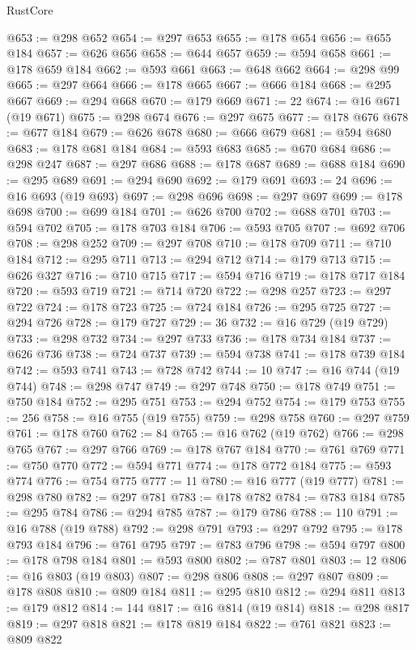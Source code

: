 \begin{lexlean}{RustCore}
\begin{coremodule}
@653 := @298 @652
@654 := @297 @653
@655 := @178 @654
@656 := @655 @184
@657 := @626 @656
@658 := @644 @657
@659 := @594 @658
@661 := @178 @659 @184
@662 := @593 @661
@663 := @648 @662
@664 := @298 @99
@665 := @297 @664
@666 := @178 @665
@667 := @666 @184
@668 := @295 @667
@669 := @294 @668
@670 := @179 @669
@671 := 22
@674 := @16 @671 (@19 @671)
@675 := @298 @674
@676 := @297 @675
@677 := @178 @676
@678 := @677 @184
@679 := @626 @678
@680 := @666 @679
@681 := @594 @680
@683 := @178 @681 @184
@684 := @593 @683
@685 := @670 @684
@686 := @298 @247
@687 := @297 @686
@688 := @178 @687
@689 := @688 @184
@690 := @295 @689
@691 := @294 @690
@692 := @179 @691
@693 := 24
@696 := @16 @693 (@19 @693)
@697 := @298 @696
@698 := @297 @697
@699 := @178 @698
@700 := @699 @184
@701 := @626 @700
@702 := @688 @701
@703 := @594 @702
@705 := @178 @703 @184
@706 := @593 @705
@707 := @692 @706
@708 := @298 @252
@709 := @297 @708
@710 := @178 @709
@711 := @710 @184
@712 := @295 @711
@713 := @294 @712
@714 := @179 @713
@715 := @626 @327
@716 := @710 @715
@717 := @594 @716
@719 := @178 @717 @184
@720 := @593 @719
@721 := @714 @720
@722 := @298 @257
@723 := @297 @722
@724 := @178 @723
@725 := @724 @184
@726 := @295 @725
@727 := @294 @726
@728 := @179 @727
@729 := 36
@732 := @16 @729 (@19 @729)
@733 := @298 @732
@734 := @297 @733
@736 := @178 @734 @184
@737 := @626 @736
@738 := @724 @737
@739 := @594 @738
@741 := @178 @739 @184
@742 := @593 @741
@743 := @728 @742
@744 := 10
@747 := @16 @744 (@19 @744)
@748 := @298 @747
@749 := @297 @748
@750 := @178 @749
@751 := @750 @184
@752 := @295 @751
@753 := @294 @752
@754 := @179 @753
@755 := 256
@758 := @16 @755 (@19 @755)
@759 := @298 @758
@760 := @297 @759
@761 := @178 @760
@762 := 84
@765 := @16 @762 (@19 @762)
@766 := @298 @765
@767 := @297 @766
@769 := @178 @767 @184
@770 := @761 @769
@771 := @750 @770
@772 := @594 @771
@774 := @178 @772 @184
@775 := @593 @774
@776 := @754 @775
@777 := 11
@780 := @16 @777 (@19 @777)
@781 := @298 @780
@782 := @297 @781
@783 := @178 @782
@784 := @783 @184
@785 := @295 @784
@786 := @294 @785
@787 := @179 @786
@788 := 110
@791 := @16 @788 (@19 @788)
@792 := @298 @791
@793 := @297 @792
@795 := @178 @793 @184
@796 := @761 @795
@797 := @783 @796
@798 := @594 @797
@800 := @178 @798 @184
@801 := @593 @800
@802 := @787 @801
@803 := 12
@806 := @16 @803 (@19 @803)
@807 := @298 @806
@808 := @297 @807
@809 := @178 @808
@810 := @809 @184
@811 := @295 @810
@812 := @294 @811
@813 := @179 @812
@814 := 144
@817 := @16 @814 (@19 @814)
@818 := @298 @817
@819 := @297 @818
@821 := @178 @819 @184
@822 := @761 @821
@823 := @809 @822

\end{coremodule}
\end{lexlean}
